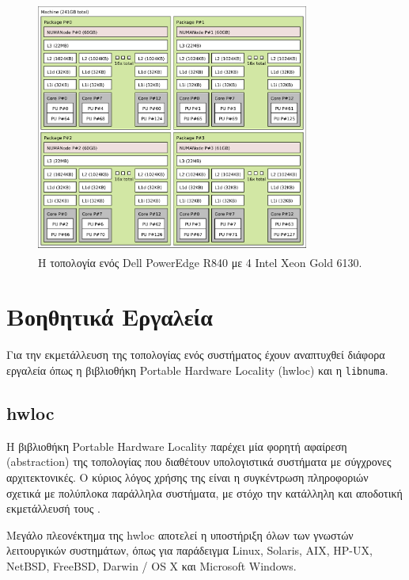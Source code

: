 \begin{figure}[t]
	\centering
	\includegraphics[width=0.8\textwidth]{Figures/parade-topo.pdf}
	\linebreak
	\caption{Η τοπολογία ενός Dell PowerEdge R840 με 4 Intel\textsuperscript{\textregistered} Xeon\textsuperscript{\textregistered} Gold 6130.}
	\label{fig:parade-topo}
\end{figure}


\section{Βοηθητικά Εργαλεία}
\label{sec:Utility Tools}
Για την εκμετάλλευση της τοπολογίας ενός συστήματος έχουν αναπτυχθεί διάφορα εργαλεία όπως η βιβλιοθήκη Portable Hardware Locality (hwloc) και η \texttt{libnuma}.

\subsection{hwloc}
\label{ssec:hwloc}
Η βιβλιοθήκη Portable Hardware Locality παρέχει μία φορητή αφαίρεση (abstraction) της τοπολογίας που διαθέτουν υπολογιστικά συστήματα με σύγχρονες αρχιτεκτονικές. Ο κύριος λόγος χρήσης της είναι η συγκέντρωση πληροφοριών σχετικά με πολύπλοκα παράλληλα συστήματα, με στόχο την κατάλληλη και αποδοτική εκμετάλλευσή τους \cite{broquedis2010hwloc}. 

Μεγάλο πλεονέκτημα της hwloc αποτελεί η υποστήριξη όλων των γνωστών λειτουργικών συστημάτων, όπως για παράδειγμα Linux, Solaris, AIX, HP-UX, NetBSD, FreeBSD, Darwin / OS X και Microsoft Windows.

